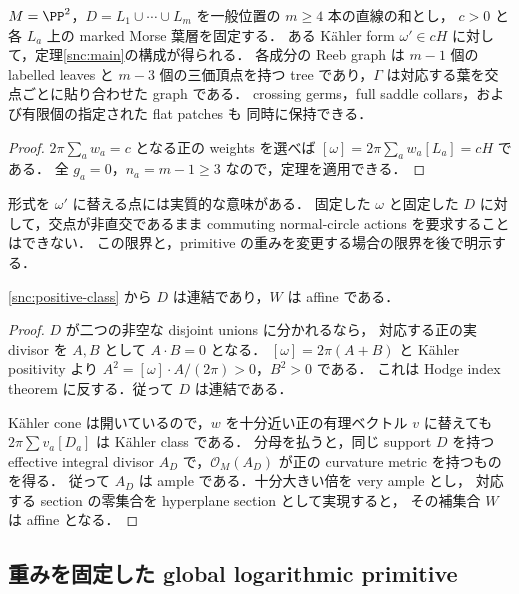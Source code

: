 \begin{corollary}
\label{comp:finite}
$M=\PP^2$，$D=L_1\cup\cdots\cup L_m$ を一般位置の $m\geq4$ 本の直線の和とし，
$c>0$ と各 $L_a$ 上の marked Morse 葉層を固定する．
ある Kähler form $\omega'\in cH$ に対して，定理\ref{snc:main}の構成が得られる．
各成分の Reeb graph は $m-1$ 個の labelled leaves と $m-3$ 個の三価頂点を持つ
tree であり，$\Gamma$ は対応する葉を交点ごとに貼り合わせた graph である．
crossing germs，full saddle collars，および有限個の指定された flat patches も
同時に保持できる．
\end{corollary}
\begin{proof}
$2\pi\sum_a w_a=c$ となる正の weights を選べば
$[\omega]=2\pi\sum_a w_a[L_a]=cH$ である．
全 $g_a=0$，$n_a=m-1\geq3$ なので，定理を適用できる．
\end{proof}

形式を $\omega'$ に替える点には実質的な意味がある．
固定した $\omega$ と固定した $D$ に対して，交点が非直交であるまま
commuting normal-circle actions を要求することはできない．
この限界と，primitive の重みを変更する場合の限界を後で明示する．

\begin{lemma}
\label{snc:affine}
\eqref{snc:positive-class} から $D$ は連結であり，$W$ は affine である．
\end{lemma}
\begin{proof}
$D$ が二つの非空な disjoint unions に分かれるなら，
対応する正の実 divisor を $A,B$ として $A\cdot B=0$ となる．
$[\omega]=2\pi(A+B)$ と Kähler positivity より
$A^2=[\omega]\cdot A/(2\pi)>0$，$B^2>0$ である．
これは Hodge index theorem に反する．従って $D$ は連結である．

Kähler cone は開いているので，$w$ を十分近い正の有理ベクトル $v$ に替えても
$2\pi\sum v_a[D_a]$ は Kähler class である．
分母を払うと，同じ support $D$ を持つ effective integral divisor
$A_D$ で，$\mathcal O_M(A_D)$ が正の curvature metric を持つものを得る．
従って $A_D$ は ample である．十分大きい倍を very ample とし，
対応する section の零集合を hyperplane section として実現すると，
その補集合 $W$ は affine となる．
\end{proof}

\subsection{重みを固定した global logarithmic primitive}

